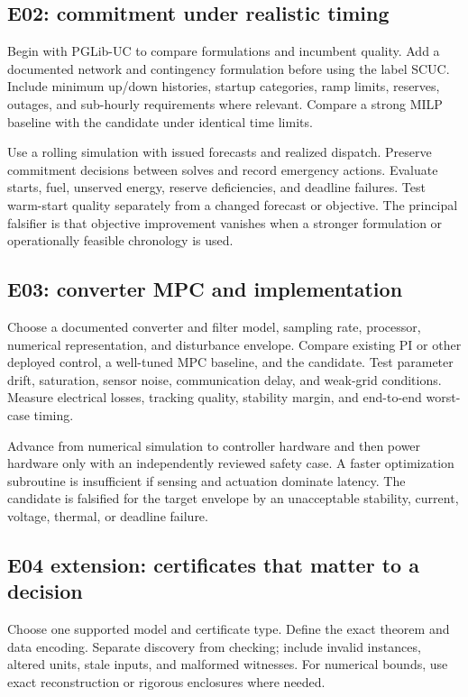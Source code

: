 \documentclass[11pt,letterpaper]{article}
\begin{document}
\subsection{E02: commitment under realistic timing}
Begin with PGLib-UC to compare formulations and incumbent quality. Add a documented network and contingency formulation before using the label SCUC. Include minimum up/down histories, startup categories, ramp limits, reserves, outages, and sub-hourly requirements where relevant. Compare a strong MILP baseline with the candidate under identical time limits.

Use a rolling simulation with issued forecasts and realized dispatch. Preserve commitment decisions between solves and record emergency actions. Evaluate starts, fuel, unserved energy, reserve deficiencies, and deadline failures. Test warm-start quality separately from a changed forecast or objective. The principal falsifier is that objective improvement vanishes when a stronger formulation or operationally feasible chronology is used.

\subsection{E03: converter MPC and implementation}
Choose a documented converter and filter model, sampling rate, processor, numerical representation, and disturbance envelope. Compare existing PI or other deployed control, a well-tuned MPC baseline, and the candidate. Test parameter drift, saturation, sensor noise, communication delay, and weak-grid conditions. Measure electrical losses, tracking quality, stability margin, and end-to-end worst-case timing.

Advance from numerical simulation to controller hardware and then power hardware only with an independently reviewed safety case. A faster optimization subroutine is insufficient if sensing and actuation dominate latency. The candidate is falsified for the target envelope by an unacceptable stability, current, voltage, thermal, or deadline failure.

\subsection{E04 extension: certificates that matter to a decision}
Choose one supported model and certificate type. Define the exact theorem and data encoding. Separate discovery from checking; include invalid instances, altered units, stale inputs, and malformed witnesses. For numerical bounds, use exact reconstruction or rigorous enclosures where needed.
\end{document}
